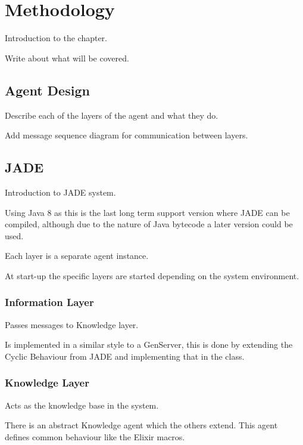 \section{Methodology}

Introduction to the chapter.

Write about what will be covered.



\subsection{Agent Design}

Describe each of the layers of the agent and what they do.

Add message sequence diagram for communication between layers.



\subsection{JADE}

Introduction to JADE system.

Using Java 8 as this is the last long term support version where JADE can be compiled, although due to the nature of Java bytecode a later version could be used.

Each layer is a separate agent instance.

At start-up the specific layers are started depending on the system environment.

\subsubsection{Information Layer}

Passes messages to Knowledge layer.

Is implemented in a similar style to a GenServer, this is done by extending the Cyclic Behaviour from JADE and implementing that in the class.

\subsubsection{Knowledge Layer}

Acts as the knowledge base in the system.

There is an abstract Knowledge agent which the others extend.
This agent defines common behaviour like the Elixir macros.

